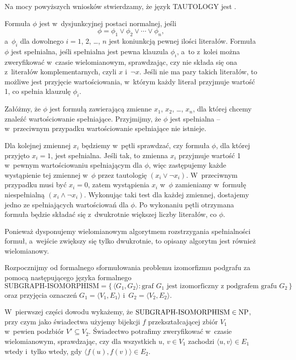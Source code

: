 Na mocy powyższych wniosków stwierdzamy, że język TAUTOLOGY jest .

\exercise %
Formuła $\phi$ jest w~dysjunkcyjnej postaci normalnej, jeśli
\[
	\phi = \phi_1\vee\phi_2\vee\cdots\vee\phi_n,
\]
a~$\phi_i$ dla dowolnego $i=1$, 2, \dots, $n$ jest koniunkcją pewnej ilości literałów.
Formuła $\phi$ jest spełnialna, jeśli spełnialna jest pewna klauzula $\phi_i$, a~to z~kolei można zweryfikować w~czasie wielomianowym, sprawdzając, czy nie składa się ona z~literałów komplementarnych, czyli $x$ i~$\neg x$.
Jeśli nie ma pary takich literałów, to możliwe jest przyjęcie wartościowania, w~którym każdy literał przyjmuje wartość 1, co spełnia klauzulę $\phi_i$.

\exercise %
Załóżmy, że $\phi$ jest formułą zawierającą zmienne $x_1$, $x_2$, \dots, $x_n$, dla której chcemy znaleźć wartościowanie spełniające.
Przyjmijmy, że $\phi$ jest spełnialna -- w~przeciwnym przypadku wartościowanie spełniające nie istnieje.

Dla kolejnej zmiennej $x_i$ będziemy w~pętli sprawdzać, czy formuła $\phi$, dla której przyjęto $x_i=1$, jest spełnialna.
Jeśli tak, to zmienna $x_i$ przyjmuje wartość 1 w~pewnym wartościowaniu spełniającym dla $\phi$, więc zastępujemy każde wystąpienie tej zmiennej w~$\phi$ przez tautologię $(x_i\vee\neg x_i)$.
W~przeciwnym przypadku musi być $x_i=0$, zatem wystąpienia $x_i$ w~$\phi$ zamieniamy w~formułę niespełnialną $(x_i\wedge\neg x_i)$.
Wykonując taki test dla każdej zmiennej, dostajemy jedno ze spełniających wartościowań dla $\phi$.
Po wykonaniu pętli otrzymana formuła będzie składać się z~dwukrotnie większej liczby literałów, co $\phi$.

Ponieważ dysponujemy wielomianowym algorytmem rozstrzygania spełnialności formuł, a~wejście zwiększy się tylko dwukrotnie, to opisany algorytm jest również wielomianowy.

\exercise %


\exercise %
Rozpocznijmy od formalnego sformułowania problemu izomorfizmu podgrafu za pomocą następującego języka formalnego 
\[
	\text{SUBGRAPH-ISOMORPHISM} = \bigl\{\,\langle G_1,G_2\rangle:\text{graf $G_1$ jest izomorficzny z~podgrafem grafu $G_2$}\,\bigr\}
\]
oraz przyjęcia oznaczeń $G_1=\langle V_1,E_1\rangle$ i~$G_2=\langle V_2,E_2\rangle$.

W~pierwszej części dowodu wykażemy, że $\text{SUBGRAPH-ISOMORPHISM}\in\text{NP}$, przy czym jako świadectwa użyjemy bijekcji $f$ przekształcającej zbiór $V_1$ w~pewien podzbiór $V'\subseteq V_2$.
Świadectwo potrafimy zweryfikować w~czasie wielomianowym, sprawdzając, czy dla wszystkich $u$, $v\in V_1$ zachodzi $\langle u,v\rangle\in E_1$ wtedy i~tylko wtedy, gdy $\langle f(u),f(v)\rangle\in E_2$.

